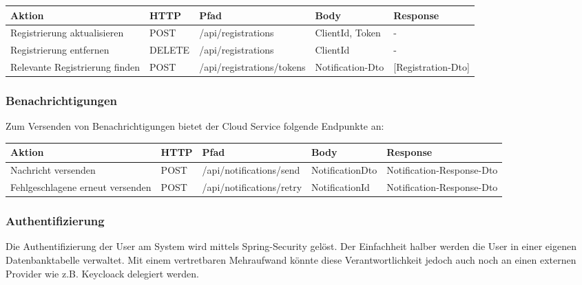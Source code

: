 \begin{tabularx}{\textwidth}{|p{5cm}|l|l|X|X|}
    \hline
    \textbf{Aktion}                & \textbf{HTTP} & \textbf{Pfad}             & \textbf{Body}   & \textbf{Response} \\
    \hline
    Registrierung aktualisieren    & POST          & /api/registrations       & ClientId, Token & -                 \\
    \hline
    Registrierung entfernen        & DELETE        & /api/registrations       & ClientId        & -                 \\
    \hline
    Relevante Registrierung finden & POST          & /api/registrations/tokens & Notification-Dto & [Registration-Dto] \\
    \hline
\end{tabularx}\label{tab:registrationsapimethods}

\subsubsection*{Benachrichtigungen}

Zum Versenden von Benachrichtigungen bietet der Cloud Service folgende Endpunkte an:

\begin{tabularx}{\textwidth}{|p{5cm}|l|l|l|X|}
    \hline
    \textbf{Aktion}                  & \textbf{HTTP} & \textbf{Pfad}            & \textbf{Body}   & \textbf{Response}       \\
    \hline
    Nachricht versenden              & POST          & /api/notifications/send & NotificationDto & Notification-Response-Dto \\
    \hline
    Fehlgeschlagene erneut versenden & POST          & /api/notifications/retry & NotificationId  & Notification-Response-Dto \\
    \hline
\end{tabularx}\label{tab:registrationsapimethodss}

\clearpage

\subsubsection{Authentifizierung}
Die Authentifizierung der User am System wird mittels Spring-Security gelöst.
Der Einfachheit halber werden die User in einer eigenen Datenbanktabelle verwaltet.
Mit einem vertretbaren Mehraufwand könnte diese Verantwortlichkeit jedoch auch noch an einen externen Provider wie z.B. Keycloack delegiert werden.


